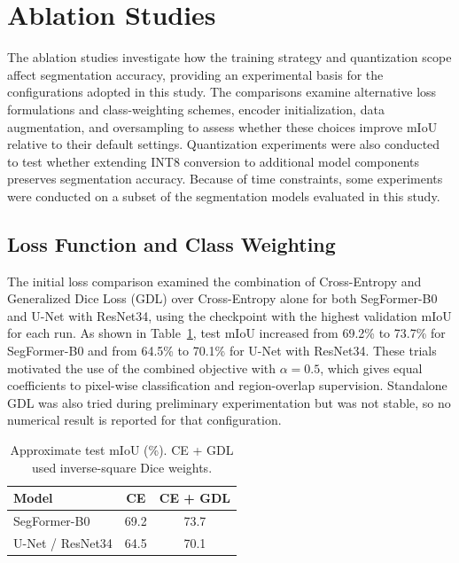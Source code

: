 \section{Ablation Studies}
\label{sec:segmentation-ablation-studies}

The ablation studies investigate how the training strategy and quantization scope affect segmentation accuracy, providing an experimental basis for the configurations adopted in this study. The comparisons examine alternative loss formulations and class-weighting schemes, encoder initialization, data augmentation, and oversampling to assess whether these choices improve mIoU relative to their default settings. Quantization experiments were also conducted to test whether extending INT8 conversion to additional model components preserves segmentation accuracy. Because of time constraints, some experiments were conducted on a subset of the segmentation models evaluated in this study.

\subsection{Loss Function and Class Weighting}

The initial loss comparison examined the combination of Cross-Entropy and Generalized Dice Loss (GDL) over Cross-Entropy alone for both SegFormer-B0 and U-Net with ResNet34, using the checkpoint with the highest validation mIoU for each run. As shown in Table~\ref{tab:s5mars-exploratory-loss-ablation}, test mIoU increased from 69.2\% to 73.7\% for SegFormer-B0 and from 64.5\% to 70.1\% for U-Net with ResNet34. These trials motivated the use of the combined objective with \(\alpha = 0.5\), which gives equal coefficients to pixel-wise classification and region-overlap supervision. Standalone GDL was also tried during preliminary experimentation but was not stable, so no numerical result is reported for that configuration.

\begin{table}[ht!]
    \centering
    \small
    \setlength{\tabcolsep}{5pt}
    \begin{tabular}{@{}l c c@{}}
        \toprule
        \textbf{Model}   & \textbf{CE} & \textbf{CE + GDL} \\
        \midrule
        \midrule
        SegFormer-B0     & 69.2        & 73.7              \\
        U-Net / ResNet34 & 64.5        & 70.1              \\
        \bottomrule
    \end{tabular}
    \vspace{5mm}
    \caption{Approximate test mIoU (\%). CE + GDL used inverse-square Dice weights.}
    \label{tab:s5mars-exploratory-loss-ablation}
\end{table}

